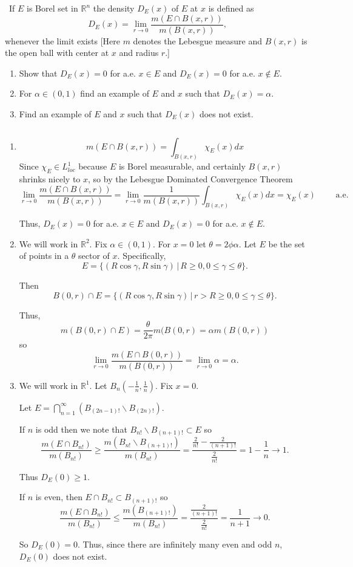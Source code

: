 \documentclass[12pt]{Qual}
\begin{document}
\begin{problem}[Folland, 3.4.25, p.100] $\,$
If $E$ is Borel set in $\mathbb{R}^n$ the density $D_E(x)$ of $E$ at $x$ is defined as $$D_E(x)=\lim_{r\to 0}\frac{m(E\cap B(x,r))}{m(B(x,r))},$$ whenever the limit exists [Here $m$ denotes the Lebesgue measure and $B(x,r)$ is the open ball with center at $x$ and radius $r.$]
\begin{enumerate}[label=(\alph*)]
    \item Show that $D_E(x)=0$ for a.e. $x\in E$ and $D_E(x)=0$ for a.e. $x\notin E$.
    \item For $\alpha\in (0,1)$ find an example of $E$ and $x$ such that $D_E(x)=\alpha$.
    \item Find an example of $E$ and $x$ such that $D_E(x)$ does not exist.
\end{enumerate}
\end{problem}


\begin{solution}$\,$
\begin{enumerate}[label=(\alph*)]
    \item $$m(E\cap B(x,r))=\int_{B(x,r)}\chi_E(x)dx$$ Since $\chi_E\in L_{loc}^1$ because $E$ is Borel measurable, and certainly $B(x,r)$ shrinks nicely to $x$, so by the Lebesgue Dominated Convergence Theorem $$\lim_{r\to0}\frac{m(E\cap B(x,r))}{m(B(x,r))}=\lim_{r\to0}\frac{1}{m(B(x,r))}\int_{B(x,r)}\chi_E(x)dx=\chi_E(x)\qquad\text{ a.e.}$$

    Thus, $D_E(x)=0$ for a.e. $x\in E$ and $D_E(x)=0$ for a.e. $x\notin E$.
    \item We will work in $\mathbb{R}^2$. Fix $\alpha\in(0,1)$. For $x=0$ let $\theta=2\phi\alpha$. Let $E$ be the set of points in a $\theta$ sector of $x$. Specifically, $$E=\{(R\cos\gamma,R\sin\gamma)\,|\,R\ge0,0\le\gamma\le\theta\}.$$

    Then $$B(0,r)\cap E=\{(R\cos\gamma,R\sin\gamma)\,|\,r>R\ge0,0\le\gamma\le\theta\}.$$

    Thus, $$m(B(0,r)\cap E)=\frac{\theta}{2\pi}m(B(0,r)=\alpha m(B(0,r))$$ so $$\lim_{r\to 0}\frac{m(E\cap B(0,r))}{m(B(0,r))}=\lim_{r\to0}\alpha=\alpha.$$
    \item We will work in $\mathbb{R}^1$. Let $B_n(-\frac{1}{n},\frac{1}{n})$. Fix $x=0$.

    Let $E=\bigcap_{n=1}^\infty(B_{(2n-1)!}\backslash B_{(2n)!}).$

    If $n$ is odd then we note that $B_{n!}\backslash B_{(n+1)!}\subset E$ so $$\frac{m(E\cap B_{n!})}{m(B_{n!})}\ge\frac{m(B_{n!}\backslash B_{(n+1)!})}{m(B_{n!})}=\frac{\frac{2}{n!}-\frac{2}{(n+1)!}}{\frac{2}{n!}}=1-\frac{1}{n}\to1.$$

    Thus $D_E(0)\ge1.$

    If $n$ is even, then $E\cap B_{n!}\subset B_{(n+1)!}$ so $$\frac{m(E\cap B_{n!})}{m(B_{n!})}\le\frac{m(B_{(n+1)!})}{m(B_{n!})}=\frac{\frac{2}{(n+1)!}}{\frac{2}{n!}}=\frac{1}{n+1}\to0.$$

    So $D_E(0)=0$. Thus, since there are infinitely many even and odd $n$, $D_E(0)$ does not exist.
\end{enumerate}
\end{solution}
\vspace{0.5cm}
\end{document}
